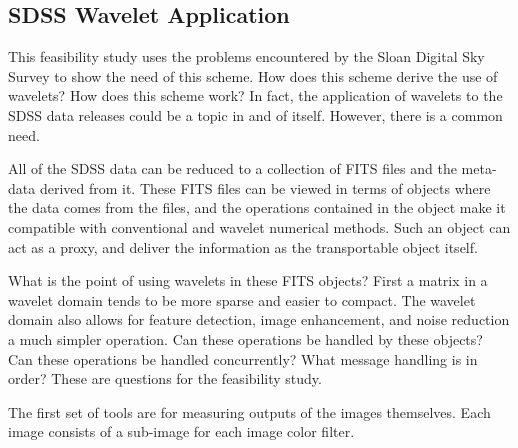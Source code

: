 \documentclass[11pt]{article}
\begin{document}
 
 
 
 \subsection {SDSS Wavelet Application}
 This feasibility study uses the problems encountered by the Sloan Digital Sky Survey to show the need of this scheme.   How does this scheme derive the use of wavelets?  How does this scheme work?   In fact, the application of wavelets to the SDSS data releases could be a topic in and of itself.  However, there is a common need.   

All of the SDSS data can be reduced to a collection of FITS files and the meta-data derived from it.  These FITS files can be viewed in terms of objects where the data comes from the files, and the operations contained in the object make it compatible with conventional and wavelet numerical methods.   Such an object can act as a proxy, and deliver the information as the transportable object itself.   

What is the point of using wavelets in these FITS objects?  First a matrix in a wavelet domain tends to be more sparse and easier to compact.  The wavelet domain also allows for feature detection,  image enhancement,  and noise reduction a much simpler operation.   Can these operations be handled by  these objects?  Can these operations be handled concurrently?  What message handling is in order?  These are questions for the feasibility study.  %


The first set of tools are for measuring outputs of the images themselves.  Each image consists of a sub-image for each image color filter.   
\end{document}
